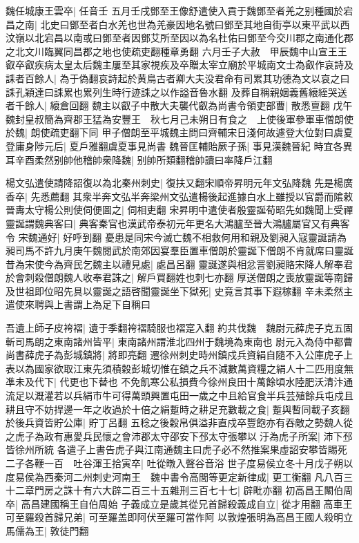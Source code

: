 魏任城康王雲卒|{
	任音壬}
五月壬戌鄧至王像舒遣使入貢于魏鄧至者羌之别種國於宕昌之南|{
	北史曰鄧至者白水羌也世為羌豪因地名號曰鄧至其地自街亭以東平武以西汶嶺以北宕昌以南或曰鄧至者因鄧艾所至因以為名杜佑曰鄧至今交川郡之南通化郡之北文川臨翼同昌郡之地也使疏吏翻種章勇翻}
六月壬子大赦　甲辰魏中山宣王王叡卒叡疾病太皇太后魏主屢至其家視疾及卒贈太宰立廟於平城南文士為叡作哀詩及誄者百餘人|{
	為于偽翻哀詩起於黄鳥古者卿大夫没君命有司累其功德為文以哀之曰誄孔穎達曰誄累也累列生時行迹誄之以作謚音魯水翻}
及葬自稱親姻義舊縗絰哭送者千餘人|{
	縗倉回翻}
魏主以叡子中散大夫襲代叡為尚書令領吏部曹|{
	散悉亶翻}
戊午魏封皇叔簡為齊郡王猛為安豐王　秋七月己未朔日有食之　上使後軍參軍車僧朗使於魏|{
	朗使疏吏翻下同}
甲子僧朗至平城魏主問曰齊輔宋日淺何故遽登大位對曰虞夏登庸身陟元后|{
	夏戶雅翻虞夏事見尚書}
魏晉匡輔貽厥子孫|{
	事見漢魏晉紀}
時宜各異耳辛酉柔然别帥他稽帥衆降魏|{
	别帥所類翻稽帥讀曰率降戶江翻}


楊文弘遣使請降詔復以為北秦州刺史|{
	復扶又翻宋順帝昇明元年文弘降魏}
先是楊廣香卒|{
	先悉薦翻}
其衆半奔文弘半奔梁州文弘遣楊後起進據白水上雖授以官爵而隂敕晉夀太守楊公則使伺便圖之|{
	伺相吏翻}
宋昇明中遣使者殷靈誕荀昭先如魏聞上受禪靈誕謂魏典客曰|{
	典客秦官也漢武帝泰初元年更名大鴻臚至晉大鴻臚屬官又有典客令}
宋魏通好|{
	好呼到翻}
憂患是同宋今滅亡魏不相救何用和親及劉昶入寇靈誕請為昶司馬不許九月庚午魏閱武於南郊因宴羣臣置車僧朗於靈誕下僧朗不肯就席曰靈誕昔為宋使今為齊民乞魏主以禮見處|{
	處昌呂翻}
靈誕遂與相忿詈劉昶賂宋降人解奉君於會刺殺僧朗魏人收奉君誅之|{
	解戶買翻姓也刺七亦翻}
厚送僧朗之喪放靈誕等南歸及世祖即位昭先具以靈誕之語啓聞靈誕坐下獄死|{
	史竟言其事下遐稼翻}
辛未柔然主遣使來聘與上書謂上為足下自稱曰

吾遺上師子皮袴褶|{
	遺于季翻袴褶騎服也褶寔入翻}
約共伐魏　魏尉元薛虎子克五固斬司馬朗之東南諸州皆平|{
	東南諸州謂淮北四州于魏境為東南也}
尉元入為侍中都曹尚書薛虎子為彭城鎮將|{
	將即亮翻}
遷徐州刺史時州鎮戍兵資絹自隨不入公庫虎子上表以為國家欲取江東先須積穀彭城切惟在鎮之兵不減數萬資糧之絹人十二匹用度無凖未及代下|{
	代更也下替也}
不免飢寒公私損費今徐州良田十萬餘頃水陸肥沃清汴通流足以溉灌若以兵絹市牛可得萬頭興置屯田一歲之中且給官食半兵芸殖餘兵屯戍且耕且守不妨捍邊一年之收過於十倍之絹蹔時之耕足充數載之食|{
	蹔與暫同載子亥翻}
於後兵資皆貯公庫|{
	貯丁呂翻}
五稔之後穀帛俱溢非直戍卒豐飽亦有吞敵之勢魏人從之虎子為政有惠愛兵民懷之會沛郡太守邵安下邳太守張攀以汙為虎子所案|{
	沛下邳皆徐州所統}
各遣子上書告虎子與江南通魏主曰虎子必不然推案果虛詔安攀皆賜死二子各鞭一百　吐谷渾王拾寅卒|{
	吐從暾入聲谷音浴}
世子度易侯立冬十月戊子朔以度易侯為西秦河二州刺史河南王　魏中書令高閭等更定新律成|{
	更工衡翻}
凡八百三十二章門房之誅十有六大辟二百三十五雜刑三百七十七|{
	辟毗亦翻}
初高昌王闞伯周卒|{
	高昌建國稱王自伯周始}
子義成立是歲其從兄首歸殺義成自立|{
	從才用翻}
高車王可至羅殺首歸兄弟|{
	可至羅盖即阿伏至羅可當作阿}
以敦煌張明為高昌王國人殺明立馬儒為王|{
	敦徒門翻}


